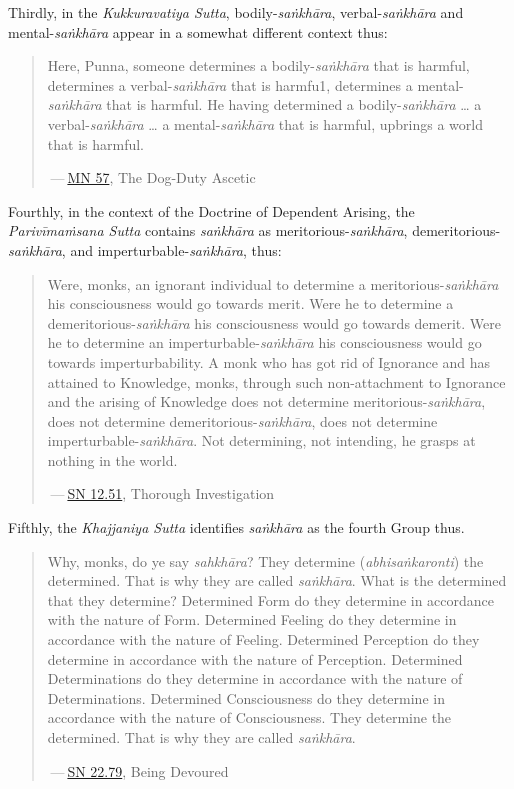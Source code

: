 Thirdly, in the \emph{Kukkuravatiya Sutta}, bodily-\emph{saṅkhāra}, verbal-\emph{saṅkhāra} and mental-\emph{saṅkhāra} appear in a somewhat different context thus:

\begin{quote}
Here, Punna, someone determines a bodily-\emph{saṅkhāra} that is harmful, determines a verbal-\emph{saṅkhāra} that is harmfu1, determines a mental-\emph{saṅkhāra} that is harmful. He having determined a bodily-\emph{saṅkhāra} \ldots{} a verbal-\emph{saṅkhāra} \ldots{} a mental-\emph{saṅkhāra} that is harmful, upbrings a world that is harmful.

 --- \href{https://suttacentral.net/mn57/en/bodhi}{MN 57}, The Dog-Duty Ascetic
\end{quote}

Fourthly, in the context of the Doctrine of Dependent Arising, the \emph{Parivīmaṁsana Sutta} contains \emph{saṅkhāra} as meritorious-\emph{saṅkhāra}, demeritorious-\emph{saṅkhāra}, and imperturbable-\emph{saṅkhāra}, thus:

\begin{quote}
Were, monks, an ignorant individual to determine a meritorious-\emph{saṅkhāra} his consciousness would go towards merit. Were he to determine a demeritorious-\emph{saṅkhāra} his consciousness would go towards demerit. Were he to determine an imperturbable-\emph{saṅkhāra} his consciousness would go towards imperturbability. A monk who has got rid of Ignorance and has attained to Knowledge, monks, through such non-attachment to Ignorance and the arising of Knowledge does not determine meritorious-\emph{saṅkhāra}, does not determine demeritorious-\emph{saṅkhāra}, does not determine imperturbable-\emph{saṅkhāra}. Not determining, not intending, he grasps at nothing in the world.

 --- \href{https://suttacentral.net/sn12.51/en/sujato}{SN 12.51}, Thorough Investigation
\end{quote}

Fifthly, the \emph{Khajjaniya Sutta} identifies \emph{saṅkhāra} as the fourth Group thus.

\begin{quote}
Why, monks, do ye say \emph{sahkhāra}? They determine (\emph{abhisaṅkaronti}) the determined. That is why they are called \emph{saṅkhāra}. What is the determined that they determine? Determined Form do they determine in accordance with the nature of Form. Determined Feeling do they determine in accordance with the nature of Feeling. Determined Perception do they determine in accordance with the nature of Perception. Determined Determinations do they determine in accordance with the nature of Determinations. Determined Consciousness do they determine in accordance with the nature of Consciousness. They determine the determined. That is why they are called \emph{saṅkhāra}.

 --- \href{https://suttacentral.net/sn22.79/en/bodhi}{SN 22.79}, Being Devoured
\end{quote}

